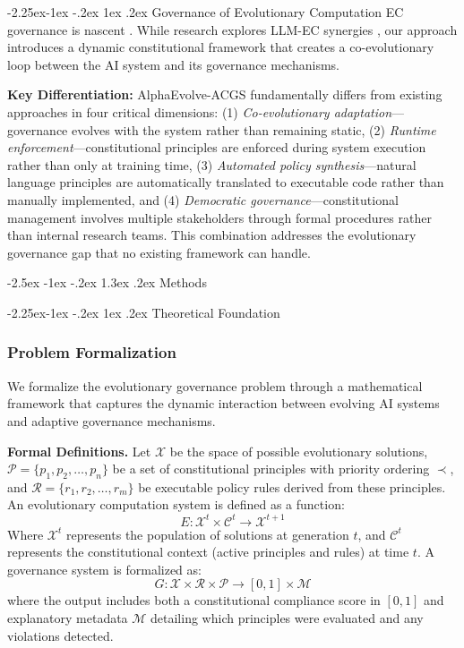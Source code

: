 \documentclass[manuscript,screen,review,anonymous,9pt]{acmart}
\makeatletter
\renewcommand\section{\@startsection{section}{1}{\z@}%
  {-2.5ex \@plus -1ex \@minus -.2ex}%
  {1.3ex \@plus.2ex}%
  {\normalfont\Large\bfseries}}
\renewcommand\subsection{\@startsection{subsection}{2}{\z@}%
  {-2.25ex\@plus -1ex \@minus -.2ex}%
  {1ex \@plus .2ex}%
  {\normalfont\large\bfseries}}
\makeatother
\begin{document}
\subsection{Governance of Evolutionary Computation}
EC governance is nascent \cite{Chauhan2025ECLLMSurvey}. While research explores LLM-EC synergies \cite{Nordin2024LLMGP}, our approach introduces a dynamic constitutional framework that creates a co-evolutionary loop between the AI system and its governance mechanisms.

\textbf{Key Differentiation:} AlphaEvolve-ACGS fundamentally differs from existing approaches in four critical dimensions: (1) \textit{Co-evolutionary adaptation}---governance evolves with the system rather than remaining static, (2) \textit{Runtime enforcement}---constitutional principles are enforced during system execution rather than only at training time, (3) \textit{Automated policy synthesis}---natural language principles are automatically translated to executable code rather than manually implemented, and (4) \textit{Democratic governance}---constitutional management involves multiple stakeholders through formal procedures rather than internal research teams. This combination addresses the evolutionary governance gap that no existing framework can handle.

\section{Methods}
\label{sec:methods}

\subsection{Theoretical Foundation}
\label{subsec:theoretical_foundation}

\subsubsection{Problem Formalization}
\label{subsubsec:problem_formalization}

We formalize the evolutionary governance problem through a mathematical framework that captures the dynamic interaction between evolving AI systems and adaptive governance mechanisms.

\textbf{Formal Definitions.} Let $\mathcal{X}$ be the space of possible evolutionary solutions, $\mathcal{P} = \{p_1, p_2, \ldots, p_n\}$ be a set of constitutional principles with priority ordering $\prec$, and $\mathcal{R} = \{r_1, r_2, \ldots, r_m\}$ be executable policy rules derived from these principles. An evolutionary computation system is defined as a function:
\[E: \mathcal{X}^t \times \mathcal{C}^t \rightarrow \mathcal{X}^{t+1}\]
Where $\mathcal{X}^t$ represents the population of solutions at generation $t$, and $\mathcal{C}^t$ represents the constitutional context (active principles and rules) at time $t$. A governance system is formalized as:
\[G: \mathcal{X} \times \mathcal{R} \times \mathcal{P} \rightarrow [0,1] \times \mathcal{M}\]
where the output includes both a constitutional compliance score in $[0,1]$ and explanatory metadata $\mathcal{M}$ detailing which principles were evaluated and any violations detected.
\end{document}
